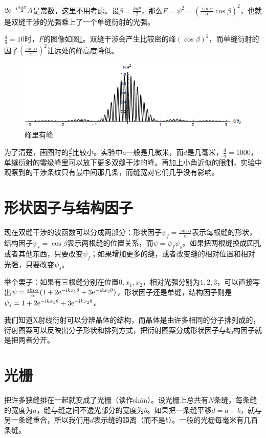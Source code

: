 $2 \mathrm{e}^{-\mathrm{i} \frac{k d \theta}{2}} A$是常数，这里不用考虑。设$\beta=\frac{k d \theta}{2}$，那么$F=\psi^2=(\frac{\sin \alpha}{\alpha} \cos  \beta)^2$，也就是双缝干涉的光强乘上了一个单缝衍射的光强。

$\frac{d}{a}=10$时，$F$的图像如图\ref{fig-silt-diff-plot-2}。双缝干涉会产生比较密的峰$(\cos \beta)^2$，而单缝衍射的因子$(\frac{\sin \alpha}{\alpha})^2$让远处的峰高度降低。
\begin{figure}[htb]
\centering
\includegraphics[scale=0.5]{fig/silt-diff-plot-2.png}
\caption{峰里有峰}
\label{fig-silt-diff-plot-2}
\end{figure}

为了清楚，画图时的$\frac{d}{a}$比较小。实验中$a$一般是几微米，而$d$是几毫米，$\frac{d}{a}=1000$，单缝衍射的零级峰里可以放下更多双缝干涉的峰。再加上小角近似的限制，实验中观察到的干涉条纹只有最中间那几条，而缝宽对它们几乎没有影响。
\section{形状因子与结构因子}
现在双缝干涉的波函数可以分成两部分：形状因子$\psi_f=\frac{\sin \alpha}{\alpha}$表示每根缝的形状，结构因子$\psi_s=\cos \beta$表示两根缝的位置关系，而$\psi=\psi_f \psi_s$。如果把两根缝换成圆孔或者其他东西，只要改变$\psi_f$；如果增加更多的缝，或者改变缝的相对位置和相对光强，只要改变$\psi_s$。

举个栗子：如果有三根缝分别在位置$0,x_1,x_2$，相对光强分别为$1,2,3$，可以直接写出$\psi=\frac{\sin \alpha}{\alpha}(1+2 \mathrm{e}^{-\mathrm{i} k x_1 \theta}+3 \mathrm{e}^{-\mathrm{i} k x_2 \theta})$，形状因子还是单缝，结构因子则是$\psi_s=1+2 \mathrm{e}^{-\mathrm{i} k x_1 \theta}+3 \mathrm{e}^{-\mathrm{i} k x_2 \theta}$。

我们知道X射线衍射可以分辨晶体的结构，而晶体是由许多相同的分子排列成的，衍射图案可以反映出分子形状和排列方式，把衍射图案分成形状因子与结构因子就是把两者分开。
\section{光栅}
把许多狭缝排在一起就变成了光栅（读作shān）。设光栅上总共有$N$条缝，每条缝的宽度为$a$，缝与缝之间不透光部分的宽度为$b$。如果把一条缝平移$d=a+b$，就与另一条缝重合，所以我们用$d$表示缝的距离（而不是$b$）。一般的光栅每毫米有几百条缝。

